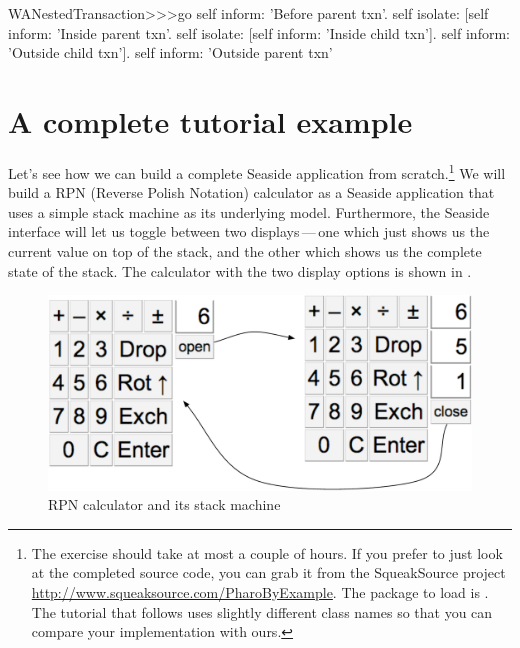 \documentclass[a4paper,10pt,twoside]{book}
\begin{document}
{{\begin{code}{}
WANestedTransaction>>>go
	self inform: 'Before parent txn'.
	self isolate:
			[self inform: 'Inside parent txn'.
			self isolate: [self inform: 'Inside child txn'].
			self inform: 'Outside child txn'].
	self inform: 'Outside parent txn'
\end{code}


\section{A complete tutorial example}


Let's see how we can build a complete Seaside application from scratch.\footnote{The exercise should take at most a couple of hours. If you prefer to just look at the completed source code, you can grab it from the SqueakSource project \url{http://www.squeaksource.com/PharoByExample}.
The package to load is . The tutorial that follows uses slightly different class names so that you can compare your implementation with ours.}
We will build a RPN (Reverse Polish Notation) calculator as a Seaside application that uses a simple stack machine as its underlying model.
Furthermore, the Seaside interface will let us toggle between two displays\,---\,one which just shows us the current value on top of the stack, and the other which shows us the complete state of the stack.
The calculator with the two display options is shown in .

\begin{figure}[ht]
\begin{center}
\includegraphics[width=\textwidth]{stackMachine}
\caption{RPN calculator and its stack machine}
\end{center}
\end{figure}

}}
\end{document}
